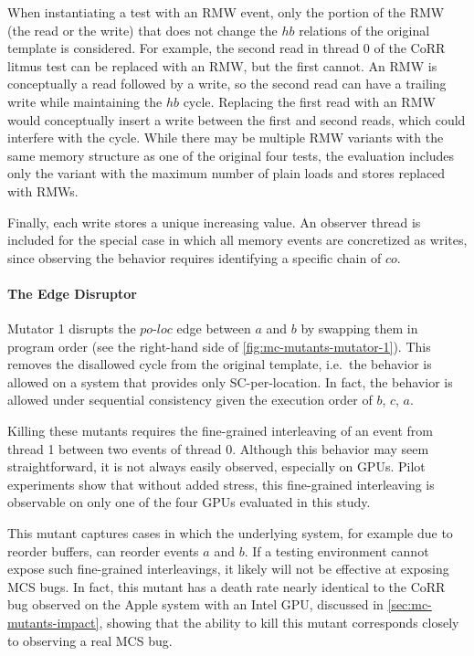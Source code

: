 When instantiating a test with an RMW event, only the portion of the RMW (the read or the write) that does not change the $hb$ relations of the original template is considered. For example, the second read in thread 0 of the CoRR litmus test can be replaced with an RMW, but the first cannot. An RMW is conceptually a read followed by a write, so the second read can have a trailing write while maintaining the $hb$ cycle. Replacing the first read with an RMW would conceptually insert a write between the first and second reads, which could interfere with the cycle.
%
While there may be multiple RMW variants with the same memory structure as one of the original four tests, the evaluation includes only the variant with the maximum number of plain loads and stores replaced with RMWs.

Finally, each write stores a unique increasing value. An observer thread is included for the special case in which all memory events are concretized as writes, since observing the behavior requires identifying a specific chain of $co$.

\paragraph{The Edge Disruptor} Mutator 1 disrupts the $\textit{po-loc}$ edge between $a$ and $b$ by swapping them in program order (see the right-hand side of \myfig\ref{fig:mc-mutants-mutator-1}). This removes the disallowed cycle from the original template, i.e.\ the behavior is allowed on a system that provides only SC-per-location. In fact, the behavior is allowed under sequential consistency given the execution order of $b$, $c$, $a$.

Killing these mutants requires the fine-grained interleaving of an event from thread 1 between two events of thread 0. Although this behavior may seem straightforward, it is not always easily observed, especially on GPUs. Pilot experiments show that without added stress, this fine-grained interleaving is observable on only one of the four GPUs evaluated in this study.

This mutant captures cases in which the underlying system, for example due to reorder buffers, can reorder events $a$ and $b$. If a testing environment cannot expose such fine-grained interleavings, it likely will not be effective at exposing MCS bugs. In fact, this mutant has a death rate nearly identical to the CoRR bug observed on the Apple system with an Intel GPU, discussed in \mysec\ref{sec:mc-mutants-impact}, showing that the ability to kill this mutant corresponds closely to observing a real MCS bug.

